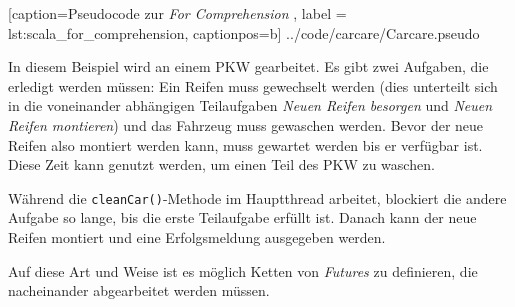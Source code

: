 
    [caption={Pseudocode zur \emph{For Comprehension} },
       label = lst:scala_for_comprehension,
       captionpos=b]
 {../code/carcare/Carcare.pseudo}
 
In diesem Beispiel wird an einem PKW gearbeitet. Es gibt zwei
Aufgaben, die erledigt werden müssen: Ein Reifen muss gewechselt werden
(dies unterteilt sich in die voneinander abhängigen Teilaufgaben
\emph{Neuen Reifen besorgen} und \emph{Neuen Reifen montieren}) und
das Fahrzeug muss gewaschen werden. Bevor der neue Reifen also montiert
werden kann, muss gewartet werden bis er verfügbar ist. Diese Zeit
kann genutzt werden, um einen Teil des PKW zu waschen.

Während die \texttt{cleanCar()}-Methode im Hauptthread arbeitet,
blockiert die andere Aufgabe so lange, bis die erste Teilaufgabe
erfüllt ist. Danach kann der neue Reifen montiert und
eine Erfolgsmeldung ausgegeben werden.

Auf diese Art und Weise ist es möglich Ketten von \emph{Futures}
zu definieren, die nacheinander abgearbeitet werden müssen.
